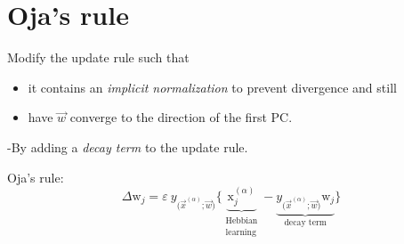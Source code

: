\section{Oja's rule}


\begin{frame}{\secname}

Modify the update rule such that 
\begin{itemize}
\item it contains an 
\emph{implicit normalization} to prevent divergence and 
still 
\item have $\vec w$ converge to the direction of the first PC.
\end{itemize}


-By adding a \emph{decay term} to the update rule.

\begin{block}{Oja's rule:}
\begin{equation}
	\Delta \mathrm{w}_j = \varepsilon~y_{ \big( \vec{x}^{(\alpha)}; \vec{w}
		\big) } \bigg\{ 
			\underbrace{ \mathrm{x}_j^{(\alpha)} }_{
				\substack{	\text{Hebbian} \\
						\text{learning} }}
			- \underbrace{ y_{ \big( \vec{x}^{(\alpha)}; \vec{w}
				\big) } \mathrm{w}_j }_{\text{decay term}}
			\bigg\}
\end{equation}
\end{block}

\end{frame}

